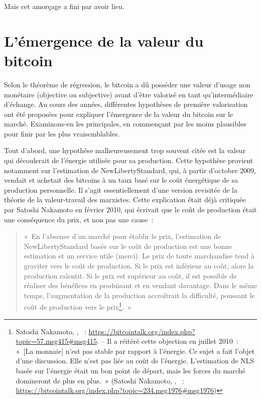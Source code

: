 Mais cet amorçage a fini par avoir lieu.

\section*{L'émergence de la valeur du bitcoin}

Selon le théorème de régression, le bitcoin a dû posséder une valeur d'usage non monétaire (objective ou subjective) avant d'être valorisé en tant qu'intermédiaire d'échange. Au cours des années, différentes hypothèses de première valorisation ont été proposées pour expliquer l'émergence de la valeur du bitcoin sur le marché. Examinons-en les principales, en commençant par les moins plausibles pour finir par les plus vraisemblables.


Tout d'abord, une hypothèse malheureusement trop souvent citée est la valeur qui découlerait de l'énergie utilisée pour sa production. Cette hypothèse provient notamment sur l'estimation de NewLibertyStandard, qui, à partir d'octobre 2009, vendait et achetait des bitcoins à un taux basé sur le coût énergétique de sa production personnelle. Il s'agit essentiellement d'une version revisitée de la théorie de la valeur-travail des marxistes. Cette explication était déjà critiquée par Satoshi Nakamoto en février 2010, qui écrivait que le coût de production était une conséquence du prix, et non pas une cause~:

\begin{quote}
«~En l'absence d'un marché pour établir le prix, l'estimation de NewLibertyStandard basée sur le coût de production est une bonne estimation et un service utile (merci). Le prix de toute marchandise tend à graviter vers le coût de production. Si le prix est inférieur au coût, alors la production ralentit. Si le prix est supérieur au coût, il est possible de réaliser des bénéfices en produisant et en vendant davantage. Dans le même temps, l'augmentation de la production accroîtrait la difficulté, poussant le coût de production vers le prix\footnote{Satoshi Nakamoto, , ~: \url{https://bitcointalk.org/index.php?topic=57.msg415\#msg415}. -- Il a réitéré cette objection en juillet 2010~: «~[La monnaie] n'est pas stable par rapport à l'énergie. Ce sujet a fait l'objet d'une discussion. Elle n'est pas liée au coût de l'énergie. L'estimation de NLS basée sur l'énergie était un bon point de départ, mais les forces du marché domineront de plus en plus.~» (Satoshi Nakamoto, , ~: \url{https://bitcointalk.org/index.php?topic=234.msg1976\#msg1976})}.~»
\end{quote}

